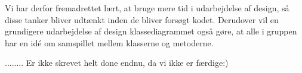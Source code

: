 \documentclass[../main.tex]{subfiles}
\begin{document}
\begin{flushleft}
Vi har derfor fremadrettet lært, at bruge mere tid i udarbejdelse af design, så disse tanker bliver udtænkt inden de bliver forsøgt kodet. Derudover vil en grundigere udarbejdelse af design klassediagrammet også gøre, at alle i gruppen har en idé om samspillet mellem klasserne og metoderne.\newline

........ Er ikke skrevet helt done endnu, da vi ikke er færdige:)

\end{flushleft}
\end{document}
